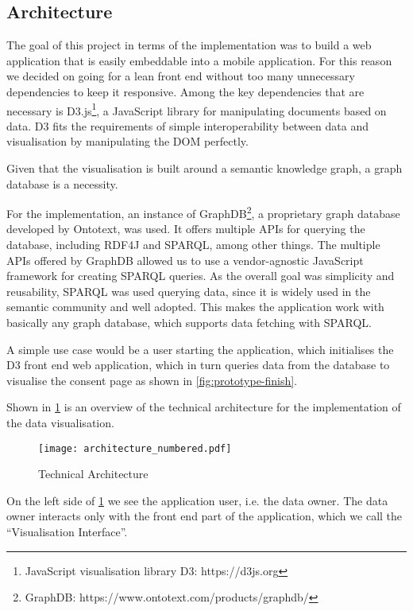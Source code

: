 \documentclass[../paper.tex]{subfiles}
\begin{document}
  \subsection{Architecture}

  The goal of this project in terms of the implementation was to
  build a web application that is easily embeddable into a mobile application.
  For this reason we decided on going for a lean front end without too many
  unnecessary dependencies to keep it responsive. Among the key dependencies that
  are necessary is D3.js\footnote{JavaScript visualisation library D3: https://d3js.org}, a JavaScript library for manipulating documents based
  on data. D3 fits the requirements of simple interoperability between
  data and visualisation by manipulating the DOM perfectly.

  Given that the
  visualisation is built around a semantic knowledge graph, a graph database is
  a necessity.

  For the implementation, an instance of  GraphDB\footnote{GraphDB: https://www.ontotext.com/products/graphdb/}, a proprietary graph
  database developed by Ontotext, was used. It offers multiple APIs for querying the database,
  including RDF4J and SPARQL, among other things. The multiple APIs offered by
  GraphDB allowed us to use a vendor-agnostic JavaScript framework for
  creating SPARQL queries. As the overall goal was simplicity and reusability,
  SPARQL was used querying data, since it is widely used
  in the semantic community and well adopted. This makes the application work with
  basically any graph database, which supports data fetching with SPARQL.

  A simple use case would be a user starting the application, which initialises
  the D3 front end web application, which in turn queries data from the database
  to visualise the consent page as shown in \cref{fig:prototype-finish}.
  

  Shown in \cref{fig:architecture} is an overview of the technical architecture
  for the implementation of the data visualisation.

  \begin{figure}
    \centering
    \texttt{[image: architecture\_numbered.pdf]}
    \caption{Technical Architecture}
    \label{fig:architecture}
  \end{figure}

  On the left side of \cref{fig:architecture} we see the application user, i.e.
  the data owner. The data owner interacts only with the front end part of the
  application, which we call the “Visualisation Interface”.
\end{document}
